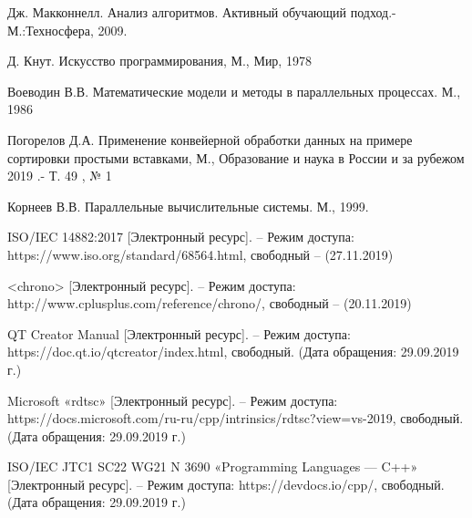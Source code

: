 \documentclass[a4paper,12pt]{article}
\begin{document}
\begin{thebibliography}{10}
	
	Дж. Макконнелл. Анализ алгоритмов. Активный 
	обучающий 
	подход.-М.:Техносфера, 2009.
	
	Д. Кнут. Искусство программирования, М., Мир, 1978
	
	Воеводин В.В. Математические модели и методы в параллельных процессах. М., 1986
	
	Погорелов Д.А. Применение конвейерной обработки данных на примере сортировки простыми вставками, М., Образование и наука в России и за рубежом
	2019 .- Т. 49 , № 1
	
	Корнеев В.В. Параллельные вычислительные системы. М., 1999.
	
	ISO/IEC 14882:2017 [Электронный ресурс]. – Режим доступа: https://www.iso.org/standard/68564.html, свободный – (27.11.2019)
	
	<chrono> [Электронный ресурс]. – Режим доступа: http://www.cplusplus.com/reference/chrono/, свободный – (20.11.2019)
	
	 QT Creator Manual [Электронный ресурс]. – Режим
	доступа: https://doc.qt.io/qtcreator/index.html, свободный. (Дата
	обращения: 29.09.2019 г.)
	
	 Microsoft «rdtsc» [Электронный ресурс]. – Режим доступа:
	https://docs.microsoft.com/ru-ru/cpp/intrinsics/rdtsc?view=vs-2019,
	свободный. (Дата обращения: 29.09.2019 г.)
	
	 ISO/IEC JTC1 SC22 WG21 N 3690 «Programming Languages — C++» [Электронный ресурс]. – Режим доступа: https://devdocs.io/cpp/, свободный. (Дата обращения: 29.09.2019 г.)
	
\end{thebibliography}
\end{document}
